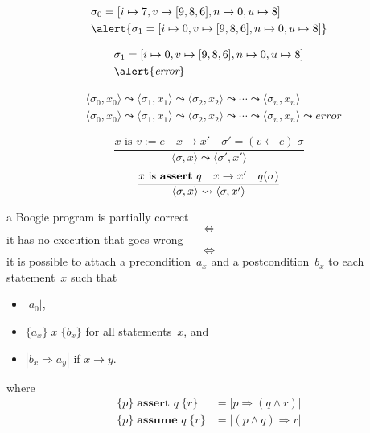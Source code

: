 \documentclass{beamer}
\newcommand{\limp}{\Rightarrow}
\begin{document}
\begin{frame}
\begin{align*}
  &\sigma_0=[i\mapsto7,v\mapsto[9,8,6],n\mapsto0,u\mapsto8]
\\
  &\alert{\sigma_1=[i\mapsto0,v\mapsto[9,8,6],n\mapsto0,u\mapsto8]}
\end{align*}
\begin{center}
\end{center}
\end{frame}

\begin{frame}
\begin{align*}
  &\sigma_1=[i\mapsto0,v\mapsto[9,8,6],n\mapsto0,u\mapsto8]
\\
  &\alert{\textit{error}}
\end{align*}
\begin{center}
\end{center}
\end{frame}
\begin{frame}
\begin{align*}
  &\langle\sigma_0,x_0\rangle\leadsto
  \langle\sigma_1,x_1\rangle\leadsto
  \langle\sigma_2,x_2\rangle\leadsto
  \cdots\leadsto
  \langle\sigma_n,x_n\rangle
\\
  &\langle\sigma_0,x_0\rangle\leadsto
  \langle\sigma_1,x_1\rangle\leadsto
  \langle\sigma_2,x_2\rangle\leadsto
  \cdots\leadsto
  \langle\sigma_n,x_n\rangle\leadsto
  \mathit{error}
\end{align*}

\pause
$$\frac
  {\text{$x$ is $v:=e$}\quad x\to x'\quad \sigma'=(v\gets e)\;\sigma}
  {\langle\sigma,x\rangle\leadsto\langle\sigma',x'\rangle}$$
$$\frac
  {\text{$x$ is \textbf{assert}~$q$}\quad x\to x'\quad q(\sigma)}
  {\langle\sigma,x\rangle\leadsto\langle\sigma,x'\rangle}$$
\end{frame}

\begin{frame}
a Boogie program is \alert{partially correct}
$$\iff$$
it has no execution that \alert{goes wrong}
$$\iff$$
it is possible to attach a precondition~$a_x$ and a postcondition~$b_x$
to each statement~$x$ such that
\begin{itemize}
\item $|a_0|$,
\item $\{a_x\}\;x\;\{b_x\}$ for all statements~$x$, and
\item $|b_x\limp a_y|$ if $x\to y$.
\end{itemize}

where
\begin{align*}
\{p\}\;\textbf{assert~$q$}\;\{r\} &= \bigl|p\limp(q\land r)\bigr| \\
\{p\}\;\textbf{assume~$q$}\;\{r\} &= \bigl|(p\land q)\limp r\bigr| \\
\end{align*}
\end{frame}
\end{document}
